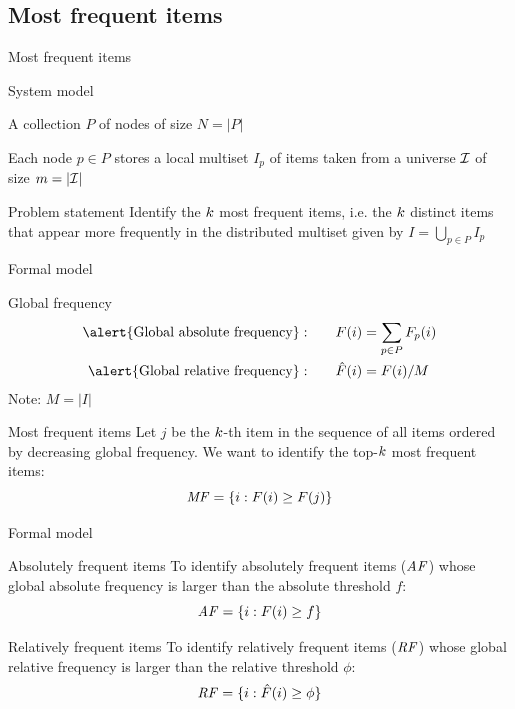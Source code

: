 \subsection{Most frequent items}

\begin{frame}{Most frequent items}

\begin{block}{System model}

\BI
\item A collection $P$ of nodes of size $N=|P|$
\item Each node $p \in P$ stores a local multiset $I_p$ of items taken
from a universe $\cal I$ of size $m=|\cal I|$
\EI
\end{block}

\begin{block}{Problem statement}
Identify the $k$ \alert{most frequent items}, i.e. the $k$ distinct items
that appear more frequently in the distributed multiset given by 
$I = \bigcup_{p \in P} I_p$
\end{block}

\begin{Bib}
\end{Bib}

\end{frame}


\begin{frame}{Formal model}

\begin{block}{Global frequency}
\begin{align*}
\textrm{\alert{Global absolute frequency}}: \qquad& \F(i) = \sum_{p \in P} \F_p(i) \\
\textrm{\alert{Global relative frequency}}: \qquad& \FR(i) = \F(i)/\M
\end{align*}
Note: $M = |I|$
\end{block}

\begin{block}{Most frequent items}
Let $j$ be the $k$-th item in the sequence of all items ordered by decreasing
global frequency. We want to identify the top-$k$ most frequent items:
\[
  \mathit{MF} = \{ i : F(i) \geq F(j) \}
\]
\end{block}


\end{frame}

\begin{frame}{Formal model}

\begin{block}{Absolutely frequent items}
To identify \alert{absolutely frequent} items ($\mathit{AF}$) whose
global absolute frequency is larger than the absolute threshold $f$:
\[
  \mathit{AF} = \{ i : F(i) \geq f \}
\]
\end{block}

\medskip
\begin{block}{Relatively frequent items}
To identify \alert{relatively frequent} items ($\mathit{RF}$) whose
global relative frequency is larger than the relative threshold $\phi$:
\[
  \mathit{RF} = \{ i : \hat{F}(i) \geq \phi \}
\]
\end{block}

\end{frame}

